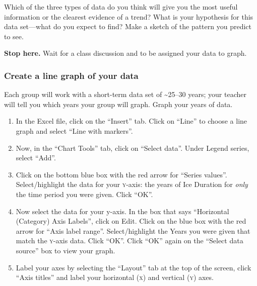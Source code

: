 \documentclass[12pt, hidelinks, addpoints]{exam}
\newcommand*\AnswerBox[2]{%
    \parbox[t][#1]{0.92\textwidth}{%
    \begin{solution}#2\end{solution}}
    \vspace*{\stretch{1}}
}
\begin{document}
\begin{questions}

\question[1]
Which of the three types of data do you think will give you the most useful
information or the clearest evidence of a trend? What is your hypothesis
for this data set—what do you expect to find? Make a sketch of the
pattern you predict to see.

\vspace*{14\baselineskip}


\textbf{Stop here.} Wait for a class discussion and to be assigned your data to graph.
\subsubsection*{Create a line graph of your data}

Each group will work with a short-term data set of \textasciitilde{}25–30
years; your teacher will tell you which years your group will graph.
Graph your years of data.

\begin{enumerate}

\item In the Excel file, click on the ``Insert'' tab. Click on ``Line'' to
choose a line graph and select ``Line with markers''.

\item Now, in the ``Chart Tools'' tab, click on ``Select data''. Under
Legend series, select ``Add''.

\item Click on the bottom blue box with the red arrow for ``Series
values''. Select/highlight the data for your \textsc{y}-axis: the years of Ice
Duration for \emph{only} the time period you were given. Click ``OK''.

\item Now select the data for your y-axis. In the box that says
``Horizontal (Category) Axis Labels'', click on Edit. Click on the blue
box with the red arrow for ``Axis label range''. Select/highlight the
Years you were given that match the \textsc{y}-axis data. Click ``OK''. Click
``OK'' again on the ``Select data source'' box to view your graph.

\item Label your axes by selecting the ``Layout'' tab at the top of the
screen, click ``Axis titles'' and label your horizontal (\textsc{x}) and vertical
(\textsc{y}) axes.


\end{enumerate}
\end{questions}
\end{document}
